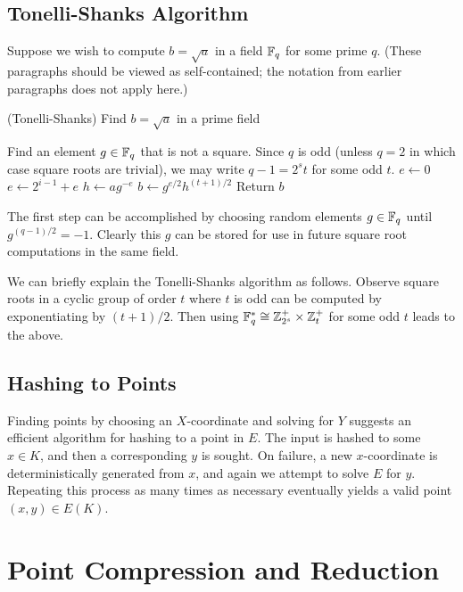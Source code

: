 \subsection {Tonelli-Shanks Algorithm}

Suppose we wish to compute $b = \sqrt{a}$ in
a field $\mathbb{F}_q$ for some prime $q$. (These paragraphs should be viewed
as self-contained; the notation from earlier paragraphs does not apply here.)

\begin{algorithm}
\caption{(Tonelli-Shanks) Find $b =\sqrt{a}$ in a prime field}
\begin{algorithmic}[1]
\STATE Find an element $g \in \mathbb{F}_q$ that is not a square.
\STATE Since $q$ is odd (unless $q = 2$ in which case square roots are trivial),
we may write $q - 1 = 2^s t$ for some odd $t$.
\STATE $e \gets 0$
\STATE $e \gets 2^{i-1} + e$
\ENDIF
\ENDFOR
\STATE $h \gets ag^{-e}$
\STATE $b \gets g^{e/2} h^{(t+1)/2}$
\STATE Return $b$
\end{algorithmic}
\end{algorithm}

The first step can be accomplished
by choosing random elements $g \in\mathbb{F}_q$ until $g^{(q-1)/2} = -1$. 
Clearly this $g$ can be stored for use in future square root computations
in the same field.

We can briefly explain the Tonelli-Shanks algorithm as follows.
Observe square roots in a cyclic group of order $t$ where $t$ is odd can be
computed by exponentiating by $(t+1)/2$.
Then using $\mathbb{F}_q^* \cong \mathbb{Z}_{2^s}^+
\times \mathbb{Z}_t^+$ for some odd $t$ leads to the above.

\subsection {Hashing to Points}

Finding points by choosing an $X$-coordinate and solving for $Y$
suggests an efficient algorithm for hashing to a point in $E$.
The input is hashed to some $x \in K$, and then a corresponding $y$ is sought.
On failure, a new $x$-coordinate is deterministically generated from $x$,
and again we attempt to solve $E$ for $y$. Repeating this process as many
times as
necessary eventually yields a valid point $(x,y) \in E(K)$.

\section {Point Compression and Reduction}

